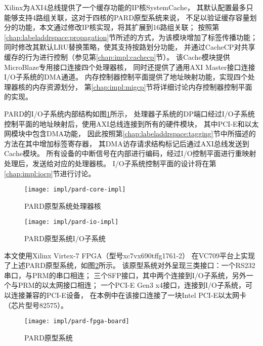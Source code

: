 Xilinx为AXI4总线提供了一个缓存功能的IP核SystemCache\cite{pg118-system-cache}，
其默认配置最多只能够支持4路组关联，这对于四核的PARD原型系统来说，
不足以验证缓存容量划分的功能，本文通过修改IP核实现，将其扩展到16路组关联；
按照第\ref{chap:labeladdrspace:propagation}节所述的方式，为该模块增加了标签传播功能；
同时修改其默认LRU替换策略，使其支持按路划分功能，
并通过CacheCP对共享缓存的行为进行控制（参见第\ref{chap:impl:cachecp}节）。
该Cache模块提供MicroBlaze专用接口连接四个处理器核，
同时还提供了通用AXI Master接口连接I/O子系统的DMA通道。
内存控制器控制平面提供了地址映射功能，实现四个处理器核的内存资源划分，
第\ref{chap:impl:migcp}节将详细讨论内存控制器控制平面的实现。

PARD的I/O子系统内部结构如图\ref{fig:pard-io-impl}所示，
处理器子系统的DP端口经过I/O子系统控制平面的地址映射后，使用AXI总线连接到所有的硬件模块，
其中PCI-E和以太网模块中包含DMA功能，
因此按照第\ref{chap:labeladdrspace:tagging}节中所描述的方法在其中增加标签寄存器，
其DMA访存请求结构标记后通过AXI总线发送到Cache模块。
所有设备的中断信号在内部进行编码，经过I/O控制平面进行重映射处理后，发送给对应的处理器核。
I/O子系统控制平面的设计将在第\ref{chap:impl:iocp}节进行讨论。

\begin{figure}[b]
\begin{minipage}{0.48\textwidth}
  \centering
  \texttt{[image: impl/pard-core-impl]}
  \caption{PARD原型系统处理器核}
  \label{fig:pard-core-impl}
\end{minipage}\hfill
\begin{minipage}{0.48\textwidth}
  \centering
  \texttt{[image: impl/pard-io-impl]}
  \caption{PARD原型系统I/O子系统}
  \label{fig:pard-io-impl}
\end{minipage}
\end{figure}

本文使用Xilinx Virtex-7 FPGA（型号xc7vx690tffg1761-2）
在VC709平台上实现了上述PARD原型系统，如图\ref{fig:pard-fpga-board}所示。
该原型系统对外呈现三类接口：一个RS232串口，与PRM的串口相连；
三个SFP接口，其中两个连接到I/O子系统，另外一个与PRM的以太网接口相连；
一个PCI-E Gen3 x4接口，连接到I/O子系统，可以连接兼容的PCI-E设备，
在本例中在该接口连接了一块Intel PCI-E以太网卡（芯片型号82575）。

\begin{figure}[tb]
  \centering
  \texttt{[image: impl/pard-fpga-board]}
  \caption{PARD原型系统}
  \label{fig:pard-fpga-board}
\end{figure}

